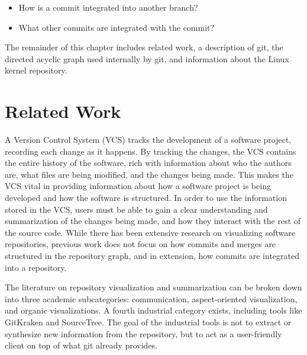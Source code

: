 \begin{textbox}
\begin{itemize}
  \item How is a commit integrated into another branch?
  \item What other commits are integrated with the commit?
\end{itemize}
\end{textbox}

The remainder of this chapter includes related work, a description of
git, the directed acyclic graph used internally by git, and information
about the Linux kernel repository.

\section{Related Work}\label{sec:related_work}

A Version Control System (VCS) tracks the development of a software project,
recording each change as it happens. By tracking the changes, the VCS
contains the entire history of the software, rich with information about
who the authors are, what files are being modified, and the changes
being made.
This makes the VCS vital in providing information about
how a software project is being developed and how the software is
structured. In order to use the information stored in the VCS, users
must be able to gain a clear understanding and summarization of the
changes being made, and how they interact with the rest of the source
code. While there has been extensive research on visualizing software
repositories, previous work does not focus on how commits and merges are
structured in the repository graph, and in extension, how commits are
integrated into a repository.

The literature on repository visualization
and summarization can be broken down into three academic subcategories:
communication\cite{Cubranic2005,Begel2010}, aspect-oriented
visualization\cite{Ambros2005,Burch2005,Ambros2009}, and organic
visualizations\cite{ogawa09,Caudwell2010}.
A fourth industrial category exists, including tools like GitKraken and
SourceTree.
The goal of the industrial tools is not to extract or synthesize new
information from the repository, but to act as a user-friendly client
on top of what git already provides.

